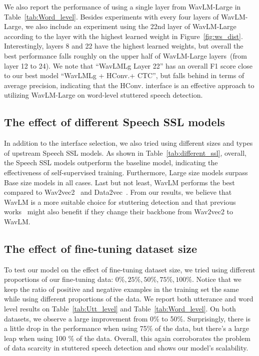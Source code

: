 We also report the performance of using a single layer from WavLM-Large in Table~\ref{tab:Word_level}.
Besides experiments with every four layers of WavLM-Large, we also include an experiment using the 22nd layer of WavLM-Large according to the layer with the highest learned weight in Figure~\ref{fig:ws_dist}.
Interestingly, layers 8 and 22 have the highest learned weights, but overall the best performance falls roughly on the upper half of WavLM-Large layers~(from layer 12 to 24).
We note that ``WavLMLg Layer 22'' has an overall F1 score close to our best model ``WavLMLg + HConv.+ CTC'', but falls behind in terms of average precision, indicating that the HConv. interface is an effective approach to utilizing WavLM-Large on word-level stuttered speech detection.

\vspace{-14pt}
\subsection{The effect of different Speech SSL models}

\vspace{-4pt}
In addition to the interface selection, we also tried using different sizes and types of upstream Speech SSL models.
As shown in Table~\ref{tab:different_ssl}, overall, the Speech SSL models outperform the baseline model, indicating the effectiveness of self-supervised training.
Furthermore, Large size models surpass Base size models in all cases.
Last but not least, WavLM performs the best compared to Wav2vec2~\cite{wav2vec2} and Data2vec~\cite{baevski22a_data2vec}.
From our results, we believe that WavLM is a more suitable choice for stuttering detection and that previous works~\cite{Payal_iccasp_Siamese,bayerl22b_interspeech,bayerl23_interspeech} might also benefit if they change their backbone from Wav2vec2 to WavLM.

\vspace{-14pt}
\subsection{The effect of fine-tuning dataset size}
\vspace{-4pt}
To test our model on the effect of fine-tuning dataset size, we tried using different proportions of our fine-tuning data: $0\%,25\%,50\%,75\%,100\%$.
Notice that we keep the ratio of positive and negative examples in the training set the same while using different proportions of the data.
We report both utterance and word level results on Table~\ref{tab:Utt_level} and Table~\ref{tab:Word_level}.
On both datasets, we observe a large improvement from 0$\%$ to 50$\%$.
Surprisingly, there is a little drop in the performance when using 75$\%$ of the data, but there's a large leap when using 100 $\%$ of the data.
Overall, this again corroborates the problem of data scarcity in stuttered speech detection and shows our model's scalability.

